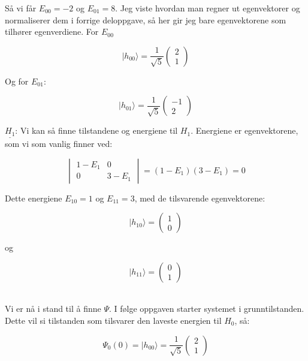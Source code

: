 \documentclass[a4paper,norsk, 10pt]{article}
\numberwithin{equation}{section}
\begin{document}
Så vi får $E_{00} = -2$ og $E_{01} = 8$. Jeg viste hvordan man regner ut egenvektorer og normaliserer dem i forrige deloppgave, så her gir jeg bare egenvektorene som tilhører egenverdiene. For $E_{00}$

\begin{equation}
|h_{00}\rangle = \frac{1}{\sqrt{5}}
\begin{pmatrix}
2\\ 1
\end{pmatrix}
\label{eq:h00}
\end{equation}

Og for $E_{01}$:

\begin{equation}
|h_{01}\rangle = \frac{1}{\sqrt{5}}
\begin{pmatrix}
-1\\ 2
\end{pmatrix}
\label{eq:h01}
\end{equation}

\textbf{$\underline{H_1}$}: Vi kan så finne tilstandene og energiene til $H_1$. Energiene er egenvektorene, som vi som vanlig finner ved:

$$
\begin{vmatrix}
1-E_1 & 0\\
0 & 3-E_1
\end{vmatrix}
= (1-E_1)(3-E_1) = 0
$$

Dette energiene $E_{10} = 1$ og $E_{11} = 3$, med de tilsvarende egenvektorene:

\begin{equation}
|h_{10}\rangle = 
\begin{pmatrix}
1\\0
\end{pmatrix}
\label{eq:h10}
\end{equation}

og 

\begin{equation}
|h_{11}\rangle = 
\begin{pmatrix}
0\\1
\end{pmatrix}
\label{eq:h11}
\end{equation}\\

\newpage

Vi er nå i stand til å finne $\Psi$. I følge oppgaven starter systemet i grunntilstanden. Dette vil si tilstanden som tilsvarer den laveste energien til $H_0$, så:

$$
\Psi_0(0) = |h_{00}\rangle = \frac{1}{\sqrt{5}}
\begin{pmatrix}
2\\1
\end{pmatrix}
$$
\end{document}
